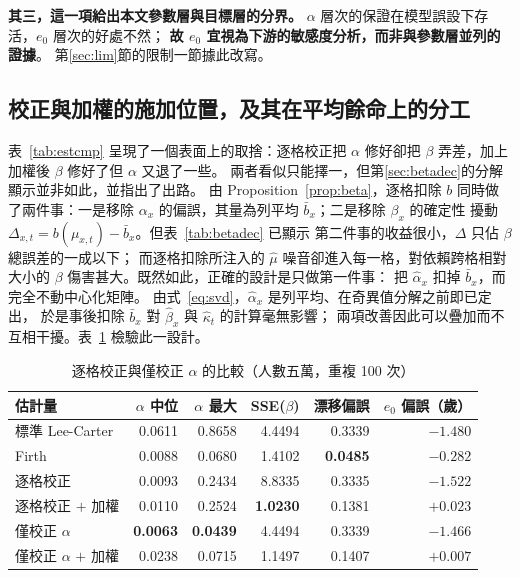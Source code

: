\documentclass[UTF8, fontset=macnew, a4paper, 12pt]{ctexart}
\begin{document}
\textbf{其三，這一項給出本文參數層與目標層的分界。}
$\alpha$ 層次的保證在模型誤設下存活，$e_0$ 層次的好處不然；
\textbf{故 $e_0$ 宜視為下游的敏感度分析，而非與參數層並列的證據}。
第\ref{sec:lim}節的限制一節據此改寫。

\subsection{校正與加權的施加位置，及其在平均餘命上的分工}\label{sec:joint}\label{sec:split}

表~\ref{tab:estcmp} 呈現了一個表面上的取捨：逐格校正把 $\alpha$ 修好卻把
$\beta$ 弄差，加上加權後 $\beta$ 修好了但 $\alpha$ 又退了一些。
兩者看似只能擇一，但第\ref{sec:betadec}的分解顯示並非如此，並指出了出路。
由 Proposition~\ref{prop:beta}，逐格扣除 $b$ 同時做了兩件事：一是移除
$\alpha_x$ 的偏誤，其量為列平均 $\bar b_x$；二是移除 $\beta_x$ 的確定性
擾動 $\Delta_{x,t}=b(\mu_{x,t})-\bar b_x$。但表~\ref{tab:betadec} 已顯示
第二件事的收益很小，$\Delta$ 只佔 $\beta$ 總誤差的一成以下；
而逐格扣除所注入的 $\hat\mu$ 噪音卻進入每一格，對依賴跨格相對大小的
$\beta$ 傷害甚大。既然如此，正確的設計是只做第一件事：
把 $\hat\alpha_x$ 扣掉 $\bar b_x$，而完全不動中心化矩陣。
由式~\eqref{eq:svd}，$\hat\alpha_x$ 是列平均、在奇異值分解之前即已定出，
於是事後扣除 $\bar b_x$ 對 $\hat\beta_x$ 與 $\hat\kappa_t$ 的計算毫無影響；
兩項改善因此可以疊加而不互相干擾。表~\ref{tab:joint} 檢驗此一設計。

\begin{table}[H]
\centering
\caption{逐格校正與僅校正 $\alpha$ 的比較（人數五萬，重複 100 次）}
\small
\begin{tabular}{lrrrrr}
\toprule
估計量 & $\alpha$ 中位 & $\alpha$ 最大 & SSE($\beta$) & 漂移偏誤 & $e_0$ 偏誤（歲）\\
\midrule
標準 Lee-Carter              & 0.0611 & 0.8658 & 4.4494 & 0.3339 & $-1.480$\\
Firth                & 0.0088 & 0.0680 & 1.4102 & \textbf{0.0485} & $-0.282$\\
逐格校正             & 0.0093 & 0.2434 & 8.8335 & 0.3335 & $-1.522$\\
逐格校正 $+$ 加權     & 0.0110 & 0.2524 & \textbf{1.0230} & 0.1381 & $+0.023$\\
僅校正 $\alpha$      & \textbf{0.0063} & \textbf{0.0439} & 4.4494 & 0.3339 & $-1.466$\\
僅校正 $\alpha$ $+$ 加權 & 0.0238 & 0.0715 & 1.1497 & 0.1407 & \textbf{$+0.007$}\\
\bottomrule
\end{tabular}
\label{tab:joint}
\end{table}
\end{document}
